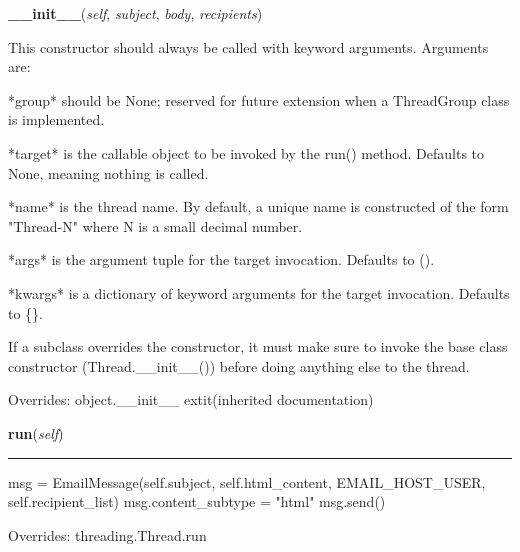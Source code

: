 \hspace{.8\funcindent}\begin{boxedminipage}{\funcwidth}

    \raggedright \textbf{\_\_init\_\_}(\textit{self}, \textit{subject}, \textit{body}, \textit{recipients})

\setlength{\parskip}{2ex}
    This constructor should always be called with keyword arguments. 
    Arguments are:

    *group* should be None; reserved for future extension when a 
    ThreadGroup class is implemented.

    *target* is the callable object to be invoked by the run() method. 
    Defaults to None, meaning nothing is called.

    *name* is the thread name. By default, a unique name is constructed of 
    the form "Thread-N" where N is a small decimal number.

    *args* is the argument tuple for the target invocation. Defaults to ().

    *kwargs* is a dictionary of keyword arguments for the target 
    invocation. Defaults to \{\}.

    If a subclass overrides the constructor, it must make sure to invoke 
    the base class constructor (Thread.\_\_init\_\_()) before doing 
    anything else to the thread.

\setlength{\parskip}{1ex}
      Overrides: object.\_\_init\_\_ 	extit{(inherited documentation)}

    \end{boxedminipage}

    \vspace{0.5ex}

\hspace{.8\funcindent}\begin{boxedminipage}{\funcwidth}

    \raggedright \textbf{run}(\textit{self})

    \vspace{-1.5ex}

    \rule{\textwidth}{0.5\fboxrule}
\setlength{\parskip}{2ex}
    msg = EmailMessage(self.subject, self.html\_content, EMAIL\_HOST\_USER,
    self.recipient\_list) msg.content\_subtype = "html" msg.send()

\setlength{\parskip}{1ex}
      Overrides: threading.Thread.run

    \end{boxedminipage}


